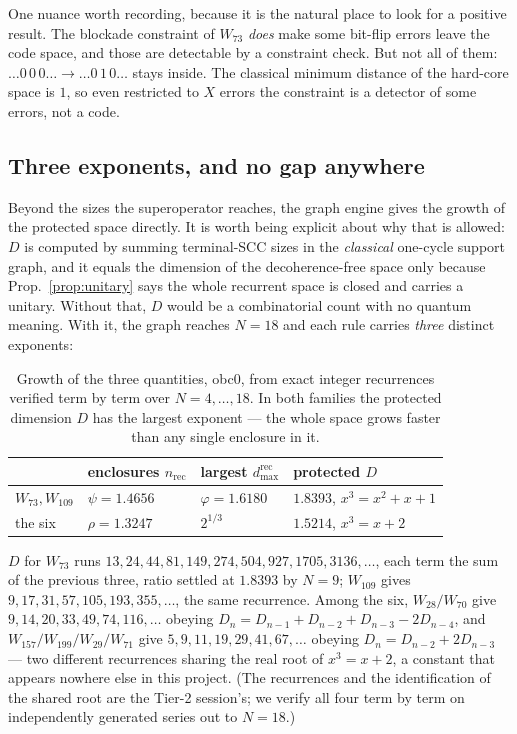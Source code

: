 \documentclass[11pt]{article}
\theoremstyle{plain}
\theoremstyle{remark}
\begin{document}
One nuance worth recording, because it is the natural place to look for a
positive result. The blockade constraint of $W_{73}$ \emph{does} make some
bit-flip errors leave the code space, and those are detectable by a
constraint check. But not all of them: $\ldots0\,0\,0\ldots \to
\ldots0\,1\,0\ldots$ stays inside. The classical minimum distance of the
hard-core space is $1$, so even restricted to $X$ errors the constraint is a
detector of some errors, not a code.

\subsection{Three exponents, and no gap anywhere}
\label{sec:exponents}

Beyond the sizes the superoperator reaches, the graph engine gives the growth of
the protected space directly. It is worth being explicit about why that is
allowed: $D$ is computed by summing terminal-SCC sizes in the \emph{classical}
one-cycle support graph, and it equals the dimension of the decoherence-free
space only because Prop.~\ref{prop:unitary} says the whole recurrent space is
closed and carries a unitary. Without that, $D$ would be a combinatorial count
with no quantum meaning. With it, the graph reaches $N=18$ and each rule carries
\emph{three} distinct exponents:

\begin{table}[htbp]
\centering
\caption{Growth of the three quantities, obc0, from exact integer recurrences
verified term by term over $N = 4,\dots,18$. In both families the protected
dimension $D$ has the largest exponent --- the whole space grows faster than any
single enclosure in it.}
\label{tab:exponents}
\begin{tabular}{llll}
\toprule
 & enclosures $n_{\mathrm{rec}}$ & largest $d^{\mathrm{rec}}_{\max}$ &
   protected $D$ \\
\midrule
$W_{73}, W_{109}$ & $\psi = 1.4656$ & $\varphi = 1.6180$ &
  $\mathbf{1.8393}$, $x^3 = x^2+x+1$ \\
the six & $\rho = 1.3247$ & $2^{1/3}$ &
  $\mathbf{1.5214}$, $x^3 = x+2$ \\
\bottomrule
\end{tabular}
\end{table}

\noindent $D$ for $W_{73}$ runs $13, 24, 44, 81, 149, 274, 504, 927, 1705,
3136, \dots$, each term the sum of the previous three, ratio settled at
$1.8393$ by $N=9$; $W_{109}$ gives $9, 17, 31, 57, 105, 193, 355, \dots$, the
same recurrence. Among the six, $W_{28}/W_{70}$ give $9, 14, 20, 33, 49, 74,
116, \dots$ obeying $D_n = D_{n-1}+D_{n-2}+D_{n-3}-2D_{n-4}$, and
$W_{157}/W_{199}/W_{29}/W_{71}$ give $5, 9, 11, 19, 29, 41, 67, \dots$ obeying
$D_n = D_{n-2}+2D_{n-3}$ --- two different recurrences sharing the real root of
$x^3 = x+2$, a constant that appears nowhere else in this project. (The
recurrences and the identification of the shared root are the Tier-2 session's;
we verify all four term by term on independently generated series out to
$N=18$.)
\end{document}
